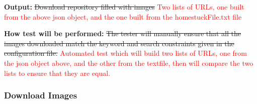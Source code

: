\documentclass[12pt, titlepage]{article}
\begin{document}
\begin{enumerate}[label=FR-SQ\arabic*:, wide=0pt, leftmargin=*]
\textbf{Output:} \sout{Download repository filled with images}
\textcolor{red}{Two lists of URLs, one built from the above json object, and the one built from the homestuckFile.txt file}
					
\textbf{How test will be performed:} \sout{The tester will manually ensure that all the images downloaded match 
the keyword and search constraints given in the configuration file.}
\textcolor{red}{Automated test which will build two lists of URLs, one from the json object above, and the other 
from the textfile, then will compare the two lists to ensure that they are equal.}

\end{enumerate}


\subsubsection{Download Images}
\end{document}
